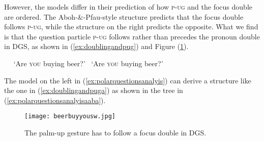 However, the models differ in their prediction of how \textsc{p-ug} and the focus double are ordered. The Aboh-\&-Pfau-style structure predicts that the focus double follows \textsc{p-ug}, while the structure on the right predicts the opposite. What we find is that the question particle \textsc{p-ug} follows rather than precedes the pronoun double in DGS, as shown in (\ref{ex:doublingandpug}) and Figure (\ref{fig:beerbuyyou}).




\begin{exe}
\ex\label{ex:doublingandpug}\begin{xlist}
\ex \textcolor{white}{*}
\glt \textcolor{white}{*}`Are \textsc{you} buying beer?' \label{ex:doublingandpuga}
\ex *
\glt \textcolor{white}{*}`Are \textsc{you} buying beer?' \label{ex:doublingandpugb}
\end{xlist}
\end{exe}

\noindent The model on the left in (\ref{ex:polarquestionsanalyis}) can derive a structure like the one in (\ref{ex:doublingandpuga}) as shown in the tree in (\ref{ex:polarquestionsanalyisaaba}).

\begin{figure}[t]
\centering
	\texttt{[image: beerbuyyousw.jpg]}
	\caption{The palm-up gesture has to follow a focus double in DGS.}
	\label{fig:beerbuyyou}
\end{figure}

%

\begin{exe}
\ex \label{ex:polarquestionsanalyisaaba}
\end{exe}




